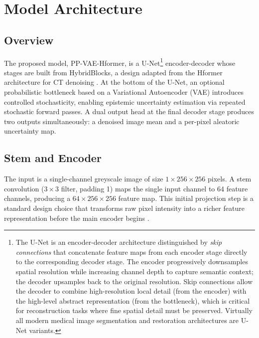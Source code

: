 \documentclass[12pt, a4paper, twoside, openright]{book}
\begin{document}
\section{Model Architecture}
\label{sec:methods:architecture}

\subsection{Overview}
\label{sec:methods:architecture:overview}

The proposed model, PP-VAE-Hformer, is a U-Net\footnote{The U-Net \cite{ronneberger_u-net_2015} is an encoder-decoder architecture distinguished by \emph{skip connections} that concatenate feature maps from each encoder stage directly to the corresponding decoder stage. The encoder progressively downsamples spatial resolution while increasing channel depth to capture semantic context; the decoder upsamples back to the original resolution. Skip connections allow the decoder to combine high-resolution local detail (from the encoder) with the high-level abstract representation (from the bottleneck), which is critical for reconstruction tasks where fine spatial detail must be preserved. Virtually all modern medical image segmentation and restoration architectures are U-Net variants.} encoder-decoder whose stages are built from HybridBlocks, a design
adapted from the Hformer architecture for CT denoising \cite{zhang_hformer_2023}. At
the bottom of the U-Net, an optional probabilistic bottleneck based on a Variational
Autoencoder (VAE) \cite{kingma_auto-encoding_2014} introduces controlled stochasticity,
enabling epistemic uncertainty estimation via repeated stochastic forward passes. A dual
output head at the final decoder stage produces two outputs simultaneously: a denoised
image mean and a per-pixel aleatoric uncertainty map.






\subsection{Stem and Encoder}
\label{sec:methods:architecture:encoder}

The input is a single-channel greyscale image of size $1 \times 256 \times 256$ pixels. A
stem convolution ($3 \times 3$ filter, padding 1) maps the single input channel to 64 feature
channels, producing a $64 \times 256 \times 256$ feature map. This initial projection step is
a standard design choice that transforms raw pixel intensity into a richer feature
representation before the main encoder begins \cite{zhang_hformer_2023}.
\end{document}

